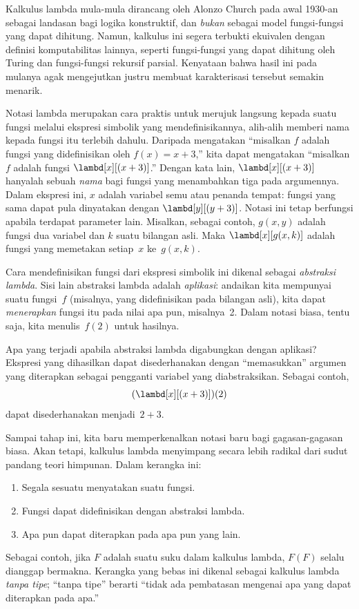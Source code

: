 \documentclass[../../../include/open-logic-section]{subfiles}
\begin{document}

Kalkulus lambda mula-mula dirancang oleh Alonzo Church pada awal 1930-an
sebagai landasan bagi logika konstruktif, dan \emph{bukan} sebagai model
fungsi-fungsi yang dapat dihitung. Namun, kalkulus ini segera terbukti
ekuivalen dengan definisi komputabilitas lainnya, seperti fungsi-fungsi yang
dapat dihitung oleh Turing dan fungsi-fungsi rekursif parsial. Kenyataan bahwa
hasil ini pada mulanya agak mengejutkan justru membuat karakterisasi tersebut
semakin menarik.

Notasi lambda merupakan cara praktis untuk merujuk langsung kepada suatu
fungsi melalui ekspresi simbolik yang mendefinisikannya, alih-alih memberi
nama kepada fungsi itu terlebih dahulu. Daripada mengatakan ``misalkan $f$
adalah fungsi yang didefinisikan oleh $f(x)=x+3$,'' kita dapat mengatakan
``misalkan $f$ adalah fungsi $\lambd[x][(x+3)]$.'' Dengan kata lain,
$\lambd[x][(x+3)]$ hanyalah sebuah \emph{nama} bagi fungsi yang menambahkan
tiga pada argumennya. Dalam ekspresi ini, $x$ adalah variabel semu atau
penanda tempat: fungsi yang sama dapat pula dinyatakan dengan
$\lambd[y][(y+3)]$. Notasi ini tetap berfungsi apabila terdapat parameter
lain. Misalkan, sebagai contoh, $g(x,y)$ adalah fungsi dua variabel dan $k$
suatu bilangan asli. Maka $\lambd[x][g(x,k)]$ adalah fungsi yang memetakan
setiap~$x$ ke~$g(x,k)$.

Cara mendefinisikan fungsi dari ekspresi simbolik ini dikenal sebagai
\emph{abstraksi lambda}. Sisi lain abstraksi lambda adalah \emph{aplikasi}:
andaikan kita mempunyai suatu fungsi~$f$ (misalnya, yang didefinisikan pada
bilangan asli), kita dapat \emph{menerapkan} fungsi itu pada nilai apa pun,
misalnya~2. Dalam notasi biasa, tentu saja, kita menulis~$f(2)$ untuk hasilnya.

Apa yang terjadi apabila abstraksi lambda digabungkan dengan aplikasi?
Ekspresi yang dihasilkan dapat disederhanakan dengan ``memasukkan'' argumen
yang diterapkan sebagai pengganti variabel yang diabstraksikan. Sebagai contoh,
\[
(\lambd[x][(x + 3)])(2)
\]
dapat disederhanakan menjadi~$2+3$.

Sampai tahap ini, kita baru memperkenalkan notasi baru bagi gagasan-gagasan
biasa. Akan tetapi, kalkulus lambda menyimpang secara lebih radikal dari sudut
pandang teori himpunan. Dalam kerangka ini:
\begin{enumerate}
\item Segala sesuatu menyatakan suatu fungsi.
\item Fungsi dapat didefinisikan dengan abstraksi lambda.
\item Apa pun dapat diterapkan pada apa pun yang lain.
\end{enumerate}
Sebagai contoh, jika $F$ adalah suatu suku dalam kalkulus lambda, $F(F)$ selalu
dianggap bermakna. Kerangka yang bebas ini dikenal sebagai kalkulus lambda
\emph{tanpa tipe}; ``tanpa tipe'' berarti ``tidak ada pembatasan mengenai apa
yang dapat diterapkan pada apa.''
\end{document}
